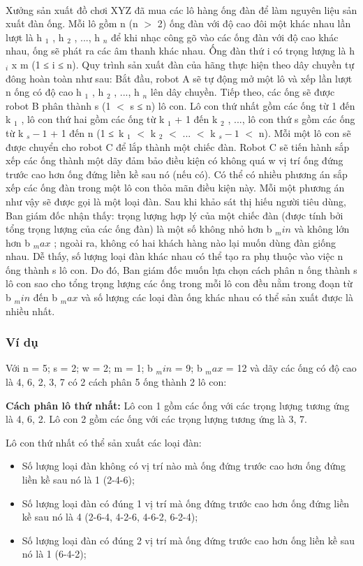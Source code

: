 

 

Xưởng sản xuất đồ chơi XYZ đã mua các lô hàng ống đàn để làm nguyên liệu sản xuất đàn ống. Mỗi lô gồm n (n $>$ 2) ống đàn với độ cao đôi một khác nhau lần lượt là h $_ 1 $ , h $_ 2 $ , ..., h $_ n $ để khi nhạc công gõ vào các ống đàn với độ cao khác nhau, ống sẽ phát ra các âm thanh khác nhau. Ống đàn thứ i có trọng lượng là h $_ i $ x m (1 ≤ i ≤ n). Quy trình sản xuất đàn của hãng thực hiện theo dây chuyền tự đông hoàn toàn như sau: Bắt đầu, robot A sẽ tự động mở một lô và xếp lần lượt n ống có độ cao h $_ 1 $ , h $_ 2 $ , ..., h $_ n $ lên dây chuyền. Tiếp theo, các ống sẽ được robot B phân thành s (1 $<$ s ≤ n) lô con. Lô con thứ nhất gồm các ống từ 1 đến k $_ 1 $ , lô con thứ hai gồm các ống từ k $_ 1 $ + 1 đến k $_ 2 $ , ..., lô con thứ s gồm các ống từ k $_ s-1 $ + 1 đến n (1 ≤ k $_ 1 $ $<$ k $_ 2 $ $<$ ... $<$ k $_ s-1 $ $<$ n). Mỗi một lô con sẽ được chuyển cho robot C để lắp thành một chiếc đàn. Robot C sẽ tiến hành sắp xếp các ống thành một dãy đảm bảo điều kiện có không quá w vị trí ống đứng trước cao hơn ống đứng liền kề sau nó (nếu có). Có thể có nhiều phương án sắp xếp các ống đàn trong một lô con thỏa mãn điều kiện này. Mỗi một phương án như vậy sẽ được gọi là một loại đàn. Sau khi khảo sát thị hiếu người tiêu dùng, Ban giám đốc nhận thấy: trọng lượng hợp lý của một chiếc đàn (được tính bởi tổng trọng lượng của các ống đàn) là một số không nhỏ hơn b $_ min $ và không lớn hơn b $_ max $ ; ngoài ra, không có hai khách hàng nào lại muốn dùng đàn giống nhau. Dễ thấy, số lượng loại đàn khác nhau có thể tạo ra phụ thuộc vào việc n ống thành s lô con. Do đó, Ban giám đốc muốn lựa chọn cách phân n ống thành s lô con sao cho tổng trọng lượng các ống trong mỗi lô con đều nằm trong đoạn từ b $_ min $ đến b $_ max $ và số lượng các loại đàn ống khác nhau có thể sản xuất được là nhiều nhất.

\subsubsection{Ví dụ}

Với n = 5; s = 2; w = 2; m = 1; b $_ min $ = 9; b $_ max $ = 12 và dãy các ống có độ cao là 4, 6, 2, 3, 7 có 2 cách phân 5 ống thành 2 lô con:

\textbf{Cách phân lô thứ nhất: } Lô con 1 gồm các ống với các trọng lượng tương ứng là 4, 6, 2. Lô con 2 gồm các ống với các trọng lượng tương ứng là 3, 7.

Lô con thứ nhất có thể sản xuất các loại đàn:
\begin{itemize}
	\item Số lượng loại đàn không có vị trí nào mà ống đứng trước cao hơn ống đứng liền kề sau nó là 1 (2-4-6);
	\item Số lượng loại đàn có đúng 1 vị trí mà ống đứng trước cao hơn ống đứng liền kề sau nó là 4 (2-6-4, 4-2-6, 4-6-2, 6-2-4);
	\item Số lượng loại đàn có đúng 2 vị trí mà ống đứng trước cao hơn ống liền kề sau nó là 1 (6-4-2);
\end{itemize}

